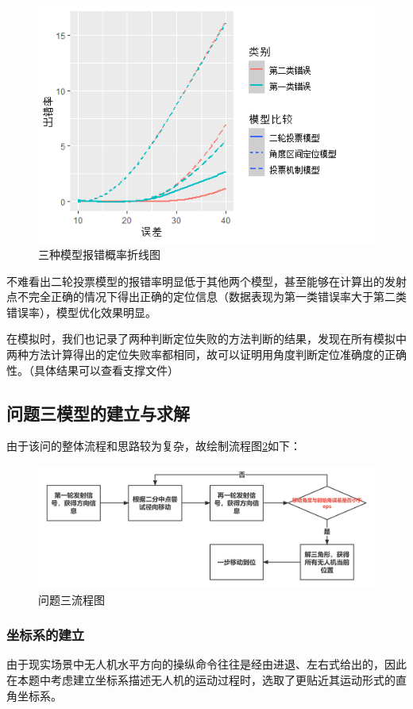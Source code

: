 \documentclass{ctexart}
\begin{document}
\begin{figure}[H]
    \centering
    \includegraphics[width=0.60\linewidth]{pic/三类比较.png}
    \caption{三种模型报错概率折线图}
    \label{三种模型报错概率折线图}
\end{figure}

不难看出二轮投票模型的报错率明显低于其他两个模型，甚至能够在计算出的发射点不完全正确的情况下得出正确的定位信息（数据表现为第一类错误率大于第二类错误率），模型优化效果明显。

在模拟时，我们也记录了两种判断定位失败的方法判断的结果，发现在所有模拟中两种方法计算得出的定位失败率都相同，故可以证明用角度判断定位准确度的正确性。（具体结果可以查看支撑文件）



\subsection{问题三模型的建立与求解}
由于该问的整体流程和思路较为复杂，故绘制流程图\ref{问题三流程图}如下：

\begin{figure}[H]
  \centering
  \includegraphics[width=0.85\linewidth]{pic/流程图（1）.jpg}
  \caption{问题三流程图}
  \label{问题三流程图}
  \end{figure}
  \subsubsection{坐标系的建立}

由于现实场景中无人机水平方向的操纵命令往往是经由进退、左右式给出的，因此在本题中考虑建立坐标系描述无人机的运动过程时，选取了更贴近其运动形式的直角坐标系。
\end{document}
